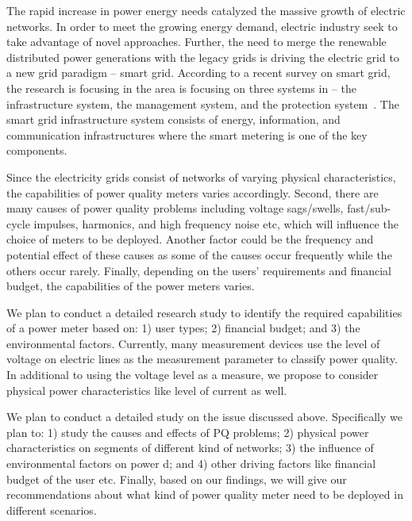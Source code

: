 \label{chap:meterChoices}
The rapid increase in power energy needs catalyzed the massive growth of electric networks. In order to meet the growing energy demand, electric industry seek to take advantage of novel approaches. Further, the need to merge the renewable distributed power generations with the legacy grids is driving the electric grid to a new grid paradigm -- smart grid. According to a recent survey on smart grid, the research is focusing in the area is  focusing on three systems in -- the infrastructure system, the management system, and the protection system~\cite{fang2011smart}. The smart grid infrastructure system consists of energy, information, and communication infrastructures where the smart metering is one of the key components.

Since the electricity grids consist of networks of varying physical characteristics, the capabilities of power quality meters varies accordingly. Second, there are many causes of power quality problems including voltage sags/swells, fast/sub-cycle impulses, harmonics, and high frequency noise etc, which will influence the choice of meters to be deployed. Another factor could be the frequency and potential effect of these causes as some of the causes occur frequently while the others occur rarely. Finally, depending on the users' requirements and financial budget, the capabilities of the power meters varies.

We plan to conduct a detailed research study to identify the required capabilities of a power meter based on: 1) user types; 2) financial budget; and 3) the environmental factors. Currently, many measurement devices use the level of voltage on electric lines as the measurement parameter to classify power quality. In additional to using the voltage level as a measure, we propose to consider physical power characteristics like level of current as well.

We plan to conduct a detailed study on the issue discussed above. Specifically we plan to: 1) study the causes and effects of PQ problems; 2) physical power characteristics on segments of different kind of networks; 3) the influence of environmental factors on power d; and 4) other driving factors like financial budget of the user etc. Finally, based on our findings, we will give our recommendations about what kind of power quality meter need to be deployed in different scenarios.